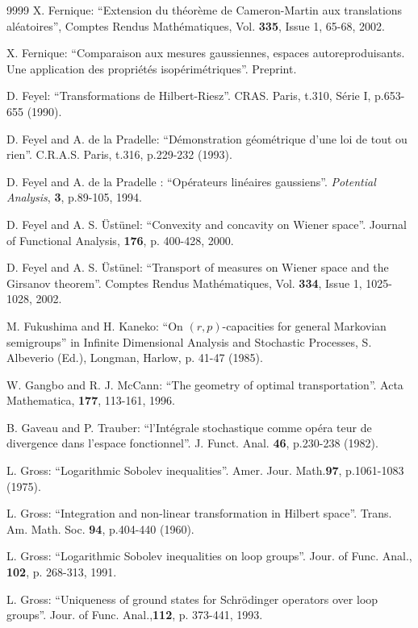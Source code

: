 \documentclass[12pt,a4paper]{book}
\begin{document}
\begin{thebibliography}{9999}
X. Fernique:
``Extension du th\'eor\`eme de Cameron-Martin aux translations
al\'eatoires'', Comptes Rendus Math\'ematiques, Vol. {\bf 335}, Issue 1,
 65-68, 2002.   

X. Fernique: ``Comparaison aux mesures gaussiennes, espaces
autoreproduisants. Une application des propri\'et\'es
isop\'erim\'etriques''. Preprint.

 D. Feyel: ``Transformations de Hilbert-Riesz''. CRAS. Paris,
t.310, S\'erie I, p.653-655 (1990).

D. Feyel and A. de la Pradelle: ``D\'emonstration
  g\'eom\'etrique d'une loi de tout ou rien''. C.R.A.S. Paris, t.316,
  p.229-232 (1993).

D. Feyel and A. de la Pradelle : ``Op\'erateurs lin\'eaires
gaussiens''. {\sl  Potential Analysis}, {\bf 3}, p.89-105, 1994.

 D. Feyel and A. S. \"Ust\"unel: ``Convexity and
  concavity on Wiener space''. Journal of Functional Analysis, {\bf
    176}, p. 400-428, 2000.

D. Feyel and A. S. \"Ust\"unel: ``Transport of measures on Wiener
space and the Girsanov theorem''. Comptes Rendus Math\'ematiques,
Vol. {\bf 334}, Issue 1, 1025-1028,  2002.




M. Fukushima and H. Kaneko: ``On $(r,p)$-capacities for
  general Markovian semigroups'' in Infinite Dimensional Analysis and
  Stochastic Processes, S. Albeverio (Ed.), Longman, Harlow, p. 41-47
  (1985).

W. Gangbo and R. J. McCann: ``The geometry of optimal
transportation''. Acta Mathematica, {\bf 177}, 113-161, 1996.


B. Gaveau and P. Trauber: ``l'Int\'egrale stochastique comme
op\'era teur de divergence dans l'espace
fonctionnel''. J. Funct. Anal. {\bf 46}, p.230-238 (1982). 

L. Gross: ``Logarithmic Sobolev
  inequalities''. Amer. Jour. Math.{\bf 97}, p.1061-1083 (1975).

L. Gross: ``Integration and non-linear transformation in
  Hilbert space''. Trans. Am. Math. Soc. {\bf 94}, p.404-440 (1960).

L. Gross: ``Logarithmic Sobolev inequalities on loop groups''.
Jour. of Func. Anal., {\bf 102}, p. 268-313, 1991.

L. Gross: ``Uniqueness of ground states for Schr\"odinger
operators over loop groups''. Jour. of Func. Anal.,{\bf  112}, p. 373-441,
1993.


\end{thebibliography}
\end{document}
